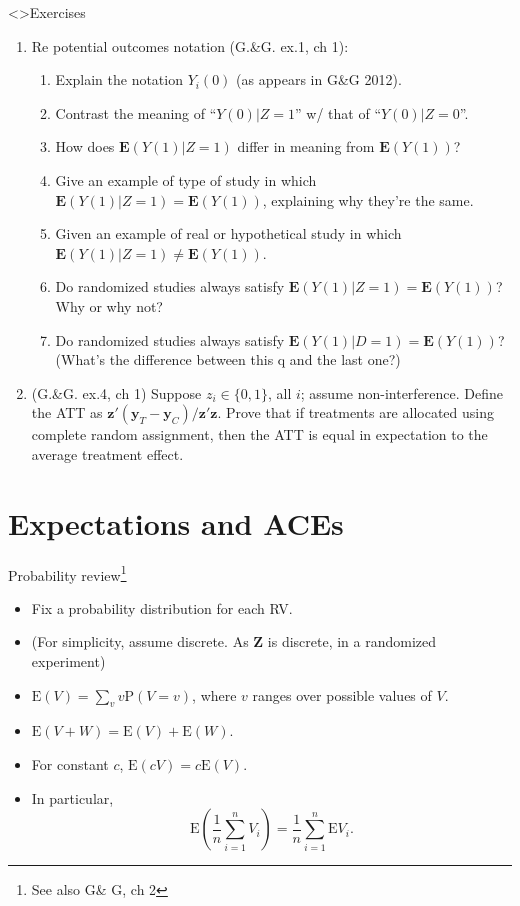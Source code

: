\begin{frame}<\nottheirhandout>{Exercises}
  \begin{enumerate}
  \item Re potential outcomes notation {}(G.\&G. ex.1, ch 1):
    \begin{enumerate}
    \item Explain the notation $Y_{i}(0)$ (as appears in G\&G 2012).
    \item Contrast the meaning of ``$Y(0) | Z=1$'' w/ that of ``$Y(0) | Z=0$''.
    \item How does $\mathbf{E}(Y(1) | Z=1)$ differ in meaning from $\mathbf{E}(Y(1))$?
    \item Give an example of type of study in which $\mathbf{E}(Y(1) | Z=1) = \mathbf{E}(Y(1))$, explaining why they're the same.
    \item Given an example of real or hypothetical study in which $\mathbf{E}(Y(1) | Z=1) \neq \mathbf{E}(Y(1))$.
    \item Do randomized studies always satisfy $\mathbf{E}(Y(1) | Z=1)
      = \mathbf{E}(Y(1))$?  Why or why not?
    \item Do randomized studies always satisfy $\mathbf{E}(Y(1) | D=1)
      = \mathbf{E}(Y(1))$?  (What's the difference between this q and
      the last one?)
    \end{enumerate}
\item (G.\&G. ex.4, ch 1) Suppose $z_{i} \in \{0,1\}$, all $i$; assume non-interference. Define the ATT as $\mathbf{z}'(\mathbf{y}_{T}-\mathbf{y}_{C})/\mathbf{z}'\mathbf{z}$.  Prove that if treatments are allocated using complete random assignment, then the ATT is equal in expectation to the average treatment effect.
  \end{enumerate}

\end{frame}
\section{Expectations and ACEs}

\begin{frame}{Probability review\footnote{See also G\& G, ch 2}}

  \begin{itemize}
  \item Fix a probability distribution for each RV.
  \item (For simplicity, assume discrete.  As $\mathbf{Z}$ is discrete, in a randomized experiment)
  \item  $\mathrm{E}(V) = \sum_v v\mathrm{P}(V=v) $, where $v$ ranges over possible values of $V$.
  \item $\mathrm{E}(V + W) = \mathrm{E}(V) + \mathrm{E}(W)$.
  \item For constant $c$, $\mathrm{E}(cV) = c\mathrm{E}(V)$.
  \item In particular, 
$$\mathrm{E}\left(\frac{1}{n} \sum_{i=1}^n V_i\right) = \frac{1}{n} \sum_{i=1}^n \mathrm{E} V_i.$$
  \end{itemize}


\end{frame}

